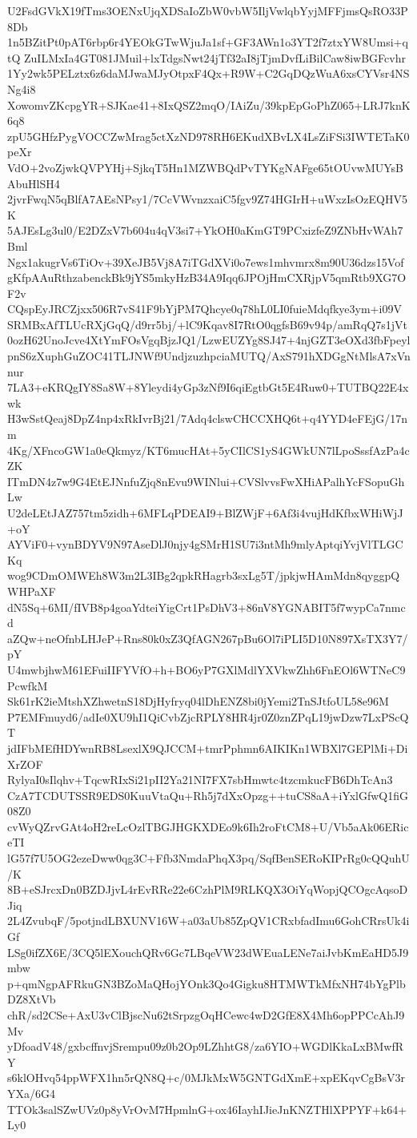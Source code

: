 U2FsdGVkX19fTms3OENxUjqXDSaIoZbW0vbW5IljVwlqbYyjMFFjmsQsRO33P8Db
1n5BZitPt0pAT6rbp6r4YEOkGTwWjuJa1sf+GF3AWn1o3YT2f7ztxYW8Umsi+qtQ
ZuILMxIa4GT081JMuil+lxTdgsNwt24jTf32aI8jTjmDvfLiBilCaw8iwBGFcvhr
1Yy2wk5PELztx6z6daMJwaMJyOtpxF4Qx+R9W+C2GqDQzWuA6xsCYVsr4NSNg4i8
XowomvZKcpgYR+SJKae41+8IxQSZ2mqO/IAiZu/39kpEpGoPhZ065+LRJ7knK6q8
zpU5GHfzPygVOCCZwMrag5ctXzND978RH6EKudXBvLX4LsZiFSi3IWTETaK0peXr
VdO+2voZjwkQVPYHj+SjkqT5Hn1MZWBQdPvTYKgNAFge65tOUvwMUYsBAbuHlSH4
2jvrFwqN5qBlfA7AEsNPsy1/7CcVWvnzxaiC5fgv9Z74HGIrH+uWxzIsOzEQHV5K
5AJEsLg3ul0/E2DZxV7b604u4qV3si7+YkOH0aKmGT9PCxizfeZ9ZNbHvWAh7Bml
Ngx1akugrVs6TiOv+39XeJB5Vj8A7iTGdXVi0o7ews1mhvmrx8m90U36dzs15Vof
gKfpAAuRthzabenckBk9jYS5mkyHzB34A9Iqq6JPOjHmCXRjpV5qmRtb9XG7OF2v
CQspEyJRCZjxx506R7vS41F9bYjPM7Qhcye0q78hL0LI0fuieMdqfkye3ym+i09V
SRMBxAfTLUcRXjGqQ/d9rr5bj/+lC9Kqav8I7RtO0qgfsB69v94p/amRqQ7s1jVt
0ozH62UnoJcve4XtYmFOsVgqBjzJQ1/LzwEUZYg8SJ47+4njGZT3eOXd3fbFpeyl
pnS6zXuphGuZOC41TLJNWf9UndjzuzhpciaMUTQ/AxS791hXDGgNtMlsA7xVnnur
7LA3+eKRQgIY8Sa8W+8Yleydi4yGp3zNf9I6qiEgtbGt5E4Ruw0+TUTBQ22E4xwk
H3wSstQeaj8DpZ4np4xRkIvrBj21/7Adq4clswCHCCXHQ6t+q4YYD4eFEjG/17nm
4Kg/XFncoGW1a0eQkmyz/KT6mucHAt+5yCIlCS1yS4GWkUN7lLpoSssfAzPa4cZK
ITmDN4z7w9G4EtEJNnfuZjq8nEvu9WINlui+CVSlvvsFwXHiAPalhYcFSopuGhLw
U2deLEtJAZ757tm5zidh+6MFLqPDEAI9+BlZWjF+6Af3i4vujHdKfbxWHiWjJ+oY
AYViF0+vynBDYV9N97AseDlJ0njy4gSMrH1SU7i3ntMh9mlyAptqiYvjVlTLGCKq
wog9CDmOMWEh8W3m2L3IBg2qpkRHagrb3sxLg5T/jpkjwHAmMdn8qyggpQWHPaXF
dN5Sq+6MI/fIVB8p4goaYdteiYigCrt1PsDhV3+86nV8YGNABIT5f7wypCa7nmcd
aZQw+neOfnbLHJeP+Rns80k0xZ3QfAGN267pBu6Ol7iPLI5D10N897XsTX3Y7/pY
U4mwbjhwM61EFuiIIFYVfO+h+BO6yP7GXlMdlYXVkwZhh6FnEOl6WTNeC9PcwfkM
Sk61rK2ieMtshXZhwetnS18DjHyfryq04lDhENZ8bi0jYemi2TnSJtfoUL58e96M
P7EMFmuyd6/adIe0XU9hI1QiCvbZjcRPLY8HR4jr0Z0znZPqL19jwDzw7LxPScQT
jdIFbMEfHDYwnRB8LsexlX9QJCCM+tmrPphmn6AIKIKn1WBXl7GEPlMi+DiXrZOF
RylyaI0sIlqhv+TqcwRIxSi21pII2Ya21NI7FX7sbHmwtc4tzcmkucFB6DhTcAn3
CzA7TCDUTSSR9EDS0KuuVtaQu+Rh5j7dXxOpzg++tuCS8aA+iYxlGfwQ1fiG08Z0
cvWyQZrvGAt4oH2reLcOzlTBGJHGKXDEo9k6Ih2roFtCM8+U/Vb5aAk06ERiceTI
lG57f7U5OG2ezeDww0qg3C+Ffb3NmdaPhqX3pq/SqfBenSERoKIPrRg0cQQuhU/K
8B+eSJrcxDn0BZDJjvL4rEvRRe22e6CzhPlM9RLKQX3OiYqWopjQCOgcAqsoDJiq
2L4ZvubqF/5potjndLBXUNV16W+a03aUb85ZpQV1CRxbfadImu6GohCRrsUk4iGf
LSg0ifZX6E/3CQ5lEXouchQRv6Gc7LBqeVW23dWEuaLENe7aiJvbKmEaHD5J9mbw
p+qmNgpAFRkuGN3BZoMaQHojYOnk3Qo4Gigku8HTMWTkMfxNH74bYgPlbDZ8XtVb
chR/sd2CSe+AxU3vClBjscNu62tSrpzgOqHCewc4wD2GfE8X4Mh6opPPCcAhJ9Mv
yDfoadV48/gxbcffnvjSrempu09z0b2Op9LZhhtG8/za6YIO+WGDlKkaLxBMwfRY
s6klOHvq54ppWFX1hn5rQN8Q+c/0MJkMxW5GNTGdXmE+xpEKqvCgBsV3rYXa/6G4
TTOk3salSZwUVz0p8yVrOvM7HpmlnG+ox46IayhIJieJnKNZTHlXPPYF+k64+Ly0

